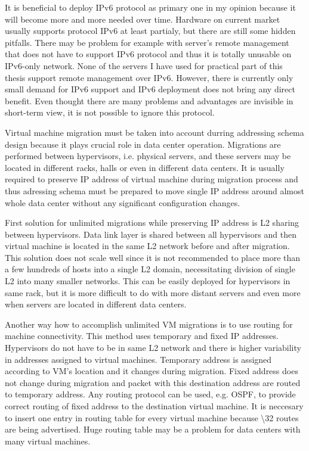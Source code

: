 It is beneficial to deploy \Ac{IPv6} protocol as primary one in my opinion because it will become more and more needed over time. Hardware on current market usually supports protocol \Ac{IPv6} at least partialy, but there are still some hidden pitfalls. There may be problem for example with server's remote management that does not have to support \Ac{IPv6} protocol and thus it is totally unusable on \Ac{IPv6}-only network. None of the servers I have used for practical part of this thesis support remote management over \Ac{IPv6}. 
However, there is currently only small demand for \Ac{IPv6} support and \Ac{IPv6} deployment does not bring any direct benefit. Even thought there are many problems and advantages are invisible in short-term view, it is not possible to ignore this protocol.

Virtual machine migration must be taken into account durring addressing schema design because it plays crucial role in data center operation. Migrations are performed between hypervisors, i.e. physical servers, and these servers may be located in different racks, halls or even in different data centers. It is usually required to preserve \Ac{IP} address of virtual machine during migration process and thus adressing schema must be prepared to move single \Ac{IP} address around almost whole data center without any significant configuration changes. 

First solution for unlimited migrations while preserving \Ac{IP} address is L2 sharing between hypervisors. Data link layer is shared between all hypervisors and then virtual machine is located in the same L2 network before and after migration. This solution does not scale well since it is not recommended to place more than a few hundreds of hosts into a single L2 domain, necessitating division of single L2 into many smaller networks. This can be easily deployed for hypervisors in same rack, but it is more difficult to do with more distant servers and even more when servers are located in different data centers.

Another way how to accomplish unlimited \Ac{VM} migrations is to use routing for machine connectivity. This method uses temporary and fixed \Ac{IP} addresses. Hypervisors do not have to be in same L2 network and there is higher variability in addresses assigned to virtual machines. Temporary address is assigned according to \Ac{VM}'s location and it changes during migration. Fixed address does not change during migration and packet with this destination address are routed to temporary address. Any routing protocol can be used, e.g. \Ac{OSPF}, to provide correct routing of fixed address to the destination virtual machine. It is neccesary to insert one entry in routing table for every virtual machine because \textbackslash 32 routes are being advertised. Huge routing table may be a problem for data centers with many virtual machines.


